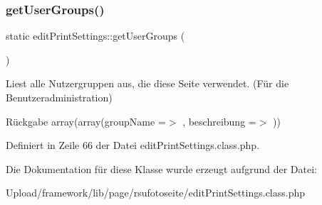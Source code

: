 \mbox{\label{classedit_print_settings_a53a036297420dfe5e6d45e4c0f80ba0a}} 
\subsubsection{\texorpdfstring{get\+User\+Groups()}{getUserGroups()}}
{\footnotesize\ttfamily static edit\+Print\+Settings\+::get\+User\+Groups (\begin{DoxyParamCaption}{ }\end{DoxyParamCaption})\hspace{0.3cm}{\ttfamily [static]}}

Liest alle Nutzergruppen aus, die diese Seite verwendet. (Für die Benutzeradministration) \begin{DoxyReturn}{Rückgabe}
array(array(\textquotesingle{}group\+Name\textquotesingle{} =$>$ \textquotesingle{}\textquotesingle{}, \textquotesingle{}beschreibung\textquotesingle{} =$>$ \textquotesingle{}\textquotesingle{})) 
\end{DoxyReturn}


Definiert in Zeile 66 der Datei edit\+Print\+Settings.\+class.\+php.



Die Dokumentation für diese Klasse wurde erzeugt aufgrund der Datei\+:\begin{DoxyCompactItemize}
\item 
Upload/framework/lib/page/rsufotoseite/edit\+Print\+Settings.\+class.\+php\end{DoxyCompactItemize}
